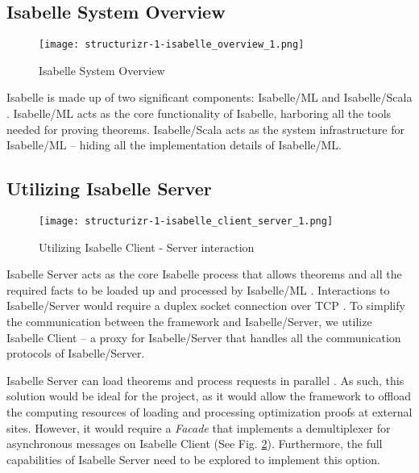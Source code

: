 \subsection{Isabelle System Overview}
\label{sec:IsabelleSystemOverview}

\begin{figure}[h]
      \centering
      \texttt{[image: structurizr-1-isabelle\_overview\_1.png]}
      \caption{Isabelle System Overview}
      \label{fig:IsabelleSystem}
\end{figure}

Isabelle is made up of two significant components: Isabelle/ML and Isabelle/Scala \cite[Ch. 5]{isabelleSystem}. Isabelle/ML acts as the core 
functionality of Isabelle, harboring all the tools needed for proving theorems. Isabelle/Scala acts as the system infrastructure for Isabelle/ML 
-- hiding all the implementation details of Isabelle/ML.

\subsection{Utilizing Isabelle Server}
\label{sec:IsabelleServer}

\begin{figure}[h]
      \centering
      \texttt{[image: structurizr-1-isabelle\_client\_server\_1.png]}
      \caption{Utilizing Isabelle Client - Server interaction}
      \label{fig:IsabelleServer}
\end{figure}

Isabelle Server acts as the core Isabelle process that allows theorems and all the required facts to be loaded up and processed by Isabelle/ML
\cite[Ch. 4]{isabelleSystem}. Interactions to Isabelle/Server would require a duplex socket connection over TCP \cite[Ch. 4.2]{isabelleSystem}. 
To simplify the communication between the framework and Isabelle/Server, we utilize Isabelle Client \cite[Ch. 4.1.2]{isabelleSystem} -- a proxy 
for Isabelle/Server that handles all the communication protocols of Isabelle/Server.

Isabelle Server can load theorems and process requests in parallel \cite[Ch. 4.2.6]{isabelleSystem}. As such, this solution would be ideal 
for the project, as it would allow the framework to offload the computing resources of loading and processing optimization proofs at external sites.
However, it would require a \emph{Facade} that implements a demultiplexer for asynchronous messages on Isabelle Client (See Fig. \ref{fig:IsabelleServer}). 
Furthermore, the full capabilities of Isabelle Server need to be explored to implement this option.

